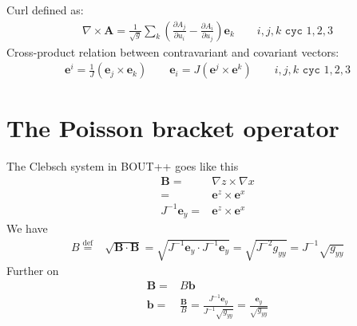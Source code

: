 \documentclass[12pt]{article}
\def\L{\left}
\def\R{\right}
\newcommand{\ve}[1]{\ensuremath{\boldsymbol{#1}}}
\newcommand{\defined}{\ensuremath{\overset{\text{def}}{=}}}
\begin{document}
%
Curl defined as:
%
\begin{align*}
\nabla\times\mathbf{A} = \frac{1}{\sqrt{g}}\sum_k\L(\frac{\partial
A_j}{\partial u_i} - \frac{\partial A_i}{\partial u_j}\R)\ve{e}_k \qquad
i,j,k \texttt{ cyc } 1,2,3
\end{align*}
%
Cross-product relation between contravariant and covariant vectors:
%
\begin{align*}
\ve{e}^i = \frac{1}{J}\L(\ve{e}_j \times \ve{e}_k\R) \qquad \ve{e}_i =
J\L(\ve{e}^j \times \ve{e}^k\R) \qquad i,j,k \texttt{ cyc } 1,2,3
\end{align*}
%





\section{The Poisson bracket operator}
%
The Clebsch system in BOUT++ goes like this
%
\begin{align*}
    \ve{B}=&\nabla z \times \nabla x\\
    =&\ve{e}^z \times \ve{e}^x\\
    J^{-1}\ve{e}_y=&\ve{e}^z \times \ve{e}^x
\end{align*}
%
We have
%
\begin{align*}
    B\defined & \sqrt{\ve{B}\cdot\ve{B}}
    = \sqrt{J^{-1}\ve{e}_y\cdot J^{-1}\ve{e}_y}
    = \sqrt{J^{-2}g_{yy}}
    = J^{-1}\sqrt{g_{yy}}
\end{align*}
%
Further on
%
\begin{align*}
    \ve{B}=&B\ve{b}\\
    \ve{b}=&\frac{\ve{B}}{B}
          =\frac{J^{-1}\ve{e}_y}{J^{-1}\sqrt{g_{yy}}}
          =\frac{\ve{e}_y}{\sqrt{g_{yy}}}
\end{align*}
\end{document}
